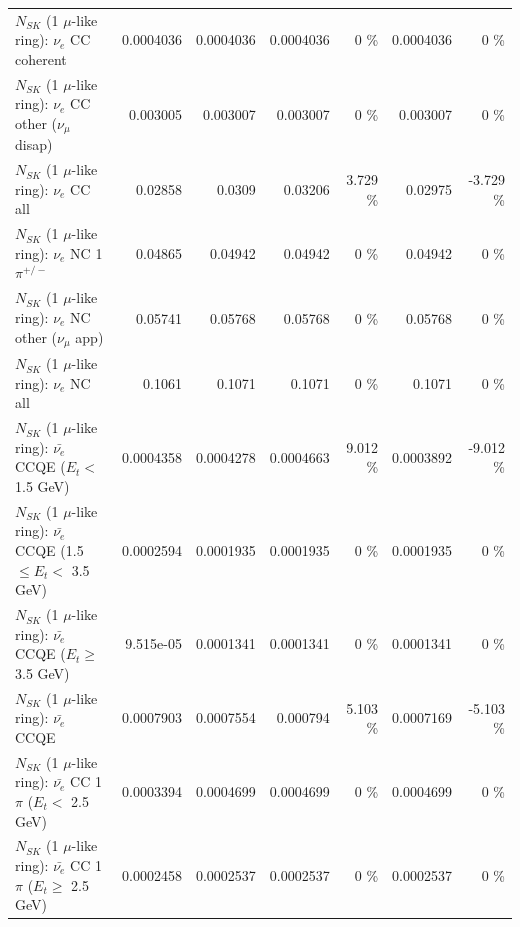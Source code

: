 \begin{table}
\begin{tabular}{| l | r | r | r  r | r  r |}
                               $N_{SK}$ (1 $\mu$-like ring): $\nu_e$ CC coherent &       0.0004036 &       0.0004036 &       0.0004036 &        0 \%  &       0.0004036 &        0 \%  \\ 
                $N_{SK}$ (1 $\mu$-like ring): $\nu_e$ CC other ($\nu_\mu$ disap) &        0.003005 &        0.003007 &        0.003007 &        0 \%  &        0.003007 &        0 \%  \\ 
                                  $N_{SK}$ (1 $\mu$-like ring): $\nu_{e}$ CC all &         0.02858 &          0.0309 &         0.03206 &    3.729 \%  &         0.02975 &   -3.729 \%  \\ 
\hline
                           $N_{SK}$ (1 $\mu$-like ring): $\nu_e$ NC 1$\pi^{+/-}$ &         0.04865 &         0.04942 &         0.04942 &        0 \%  &         0.04942 &        0 \%  \\ 
                  $N_{SK}$ (1 $\mu$-like ring): $\nu_e$ NC other ($\nu_\mu$ app) &         0.05741 &         0.05768 &         0.05768 &        0 \%  &         0.05768 &        0 \%  \\ 
                                  $N_{SK}$ (1 $\mu$-like ring): $\nu_{e}$ NC all &          0.1061 &          0.1071 &          0.1071 &        0 \%  &          0.1071 &        0 \%  \\ 
\hline
\hline
\hline
            $N_{SK}$ (1 $\mu$-like ring): $\bar{\nu_e}$ CCQE ($E_{t} <$ 1.5 GeV) &       0.0004358 &       0.0004278 &       0.0004663 &    9.012 \%  &       0.0003892 &   -9.012 \%  \\ 
   $N_{SK}$ (1 $\mu$-like ring): $\bar{\nu_e}$ CCQE (1.5 $\leq E_{t} <$ 3.5 GeV) &       0.0002594 &       0.0001935 &       0.0001935 &        0 \%  &       0.0001935 &        0 \%  \\ 
         $N_{SK}$ (1 $\mu$-like ring): $\bar{\nu_e}$ CCQE ($E_{t} \geq$ 3.5 GeV) &       9.515e-05 &       0.0001341 &       0.0001341 &        0 \%  &       0.0001341 &        0 \%  \\ 
\hline
                                $N_{SK}$ (1 $\mu$-like ring): $\bar{\nu_e}$ CCQE &       0.0007903 &       0.0007554 &        0.000794 &    5.103 \%  &       0.0007169 &   -5.103 \%  \\ 
\hline
       $N_{SK}$ (1 $\mu$-like ring): $\bar{\nu_e}$ CC 1$\pi$ ($E_{t} <$ 2.5 GeV) &       0.0003394 &       0.0004699 &       0.0004699 &        0 \%  &       0.0004699 &        0 \%  \\ 
    $N_{SK}$ (1 $\mu$-like ring): $\bar{\nu_e}$ CC 1$\pi$ ($E_{t} \geq$ 2.5 GeV) &       0.0002458 &       0.0002537 &       0.0002537 &        0 \%  &       0.0002537 &        0 \%  \\ 

\end{tabular}
\end{table}
